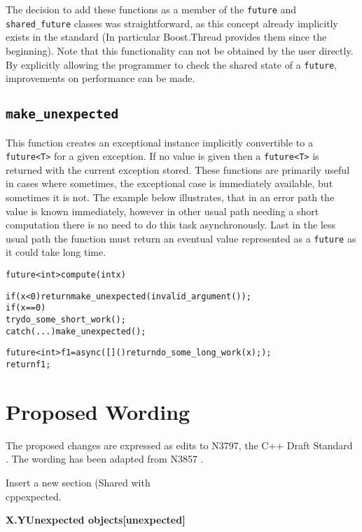 \documentclass[a4paper,10pt]{article}
\newcommand{\wordingSec}[2]{\vspace{15pt}
\noindent
{\large\textbf{X.Y\quad #1\hfill\textbf{[#2]}}}
}
\newcommand{\cpp}[1]{\lstinline{#1}}
\newcommand{\update}[1]{\colorbox{update_color}{#1}}
\begin{document}
The decision to add these functions as a member of the \cpp{future} and \cpp{shared_future} classes was straightforward, as this concept already implicitly exists in the standard (In particular Boost.Thread provides them since the beginning). Note that this functionality can not be obtained by the user directly. By explicitly allowing the programmer to check the shared state of a \cpp{future}, improvements on performance can be made.  
 
\subsection{\update{\cpp{make_unexpected}}}

This function creates an exceptional instance implicitly convertible to a \cpp{future<T>} for a given exception. If no value is given then a \cpp{future<T>} is returned with the current exception stored. These functions are primarily useful in cases where sometimes, the exceptional case is immediately available, but sometimes it is not. The example below illustrates, that in an error path the value is known immediately, however in other usual path needing a short computation there is no need to do this task asynchronously. Last in the  less usual path the function must return an eventual value represented as a \cpp{future} as it could take long time. 

\begin{alltt}
future<int> compute(int x) { 
 
  if (x < 0) return make_unexpected(invalid_argument());
  if (x == 0) 
    try { do_some_short_work(); } 
    catch (...) { make_unexpected(); }
 
  future<int> f1 = async([]() { return do_some_long_work(x); }); 
  return f1; 
}
\end{alltt}

\section{Proposed Wording}

The proposed changes are expressed as edits to N3797, the C++ Draft Standard \cite{CXX_DRAFT}. The wording has been adapted from N3857  \cite{N3857}.

Insert a new section (Shared with \\cpp{expected}. 

\wordingSec{Unexpected objects}{unexpected}
\end{document}

